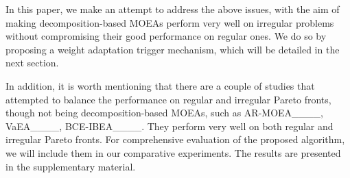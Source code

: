 In this paper, we make an attempt to address the above issues, with the aim of making decomposition-based MOEAs perform very well on irregular problems without compromising their good performance on regular ones. We do so by proposing a weight adaptation trigger mechanism, which will be detailed in the next section. 


In addition, 
it is worth mentioning that there are a couple of studies that attempted to balance the performance on regular and irregular Pareto fronts, though not being decomposition-based MOEAs, such as AR-MOEA____, VaEA____, BCE-IBEA____. 
They perform very well on both regular and irregular Pareto fronts. 
For comprehensive evaluation of the proposed algorithm, we will include them in our comparative experiments. The results are presented in the supplementary material. 




